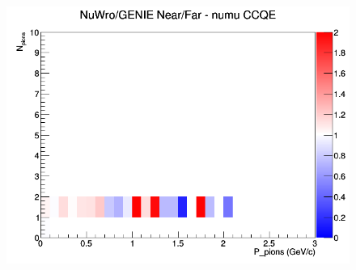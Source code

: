 \documentclass[12pt]{article}
\begin{document}
\begin{figure}[h]
\endminipage
{}
\includegraphics[width=\linewidth]{N_P/nominal/pions/ratios/CCQE_NuWro_GENIE_numu_NF_N_P.png}
\endminipage
\newline
\end{figure}
\clearpage
\end{document}
